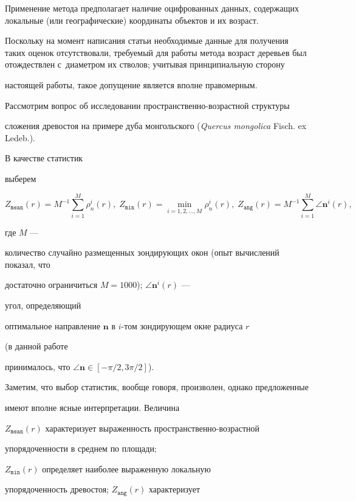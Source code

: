 Применение метода предполагает наличие оцифрованных данных, содержащих локальные (или географические) координаты объектов и их возраст. 

Поскольку на момент написания статьи необходимые данные для получения таких оценок отсутствовали,  требуемый для работы метода возраст деревьев был отождествлен с~диаметром их стволов; учитывая принципиальную сторону 

настоящей работы, такое допущение является вполне правомерным.



Рассмотрим вопрос об исследовании про\-стран\-ствен\-но-воз\-раст\-ной структуры

сложения древостоя на примере дуба монгольского ({\it Quercus mongolica} Fisch. ex Ledeb.). 

В качестве статистик  

выберем 

$$

Z_{\texttt{mean}}(r)=M^{-1}\sum\limits_{i=1}^M{\rho_n^i(r)},\;

Z_{\texttt{min}}(r)=\mathop{\min}\limits_{i=1,2,\dots,M}{\rho_n^i(r)}, \;

Z_{\texttt{ang}}(r)=M^{-1}\sum\limits_{i=1}^M{\angle \mathbf{n}^i(r)},$$ 

где $M$ ---

количество случайно размещенных зондирующих окон (опыт вычислений показал, что 

достаточно ограничиться $M=1000$); $\angle \mathbf{n}^i(r)$ --- 

угол, определяющий

оптимальное направление $\mathbf{n}$ в $i$-том зондирующем окне радиуса $r$ 

(в данной работе

принималось, что $\angle \mathbf{n} \in [-\pi/2, 3\pi/2]$).

 

Заметим, что выбор статистик, вообще говоря,  произволен, однако предложенные

имеют вполне ясные  интерпретации. Величина

$Z_{\texttt{mean}}(r)$ характеризует выраженность про\-странствен\-но-воз\-раст\-ной

упорядоченности в среднем по площади;  

$Z_{\texttt{min}}(r)$ определяет наиболее выраженную локальную

упорядоченность древостоя; $Z_{\texttt{ang}}(r)$ характеризует 

